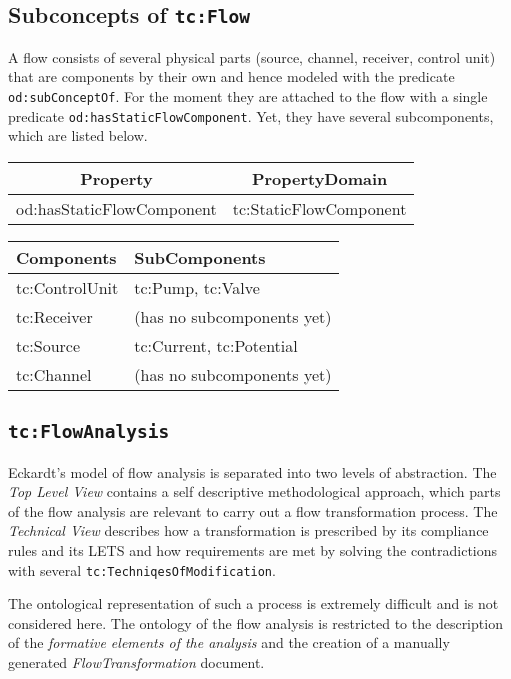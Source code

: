 \documentclass[a4paper,11pt]{article}
\begin{document}
\subsection{Subconcepts of \texttt{tc:Flow}}

A flow consists of several physical parts (source, channel, receiver, control
unit) that are components by their own and hence modeled with the predicate
\texttt{od:subConceptOf}. For the moment they are attached to the flow with a
single predicate \texttt{od:hasStaticFlowComponent}. Yet, they have several
subcomponents, which are listed below.

\begin{center}
\begin{tabular}{|c|c|}\hline
Property & PropertyDomain \\\hline
od:hasStaticFlowComponent & tc:StaticFlowComponent \\\hline 
\end{tabular}
\end{center}

\begin{center}
\begin{tabular}{|l|p{10cm}|}\hline
Components & SubComponents \\\hline
tc:ControlUnit & tc:Pump, tc:Valve \\
tc:Receiver & (has no subcomponents yet) \\
tc:Source & tc:Current, tc:Potential \\
tc:Channel & (has no subcomponents yet)\\\hline 
\end{tabular}
\end{center}

\subsection{\texttt{tc:FlowAnalysis}}
Eckardt's model of flow analysis is separated into two levels of abstraction.
The \emph{Top Level View} contains a self descriptive methodological approach,
which parts of the flow analysis are relevant to carry out a flow
transformation process. The \emph{Technical View} describes how a
transformation is prescribed by its compliance rules and its LETS and how
requirements are met by solving the contradictions with several
\texttt{tc:TechniqesOfModification}.

The ontological representation of such a process is extremely difficult and is
not considered here. The ontology of the flow analysis is restricted to the
description of the \emph{formative elements of the analysis} and the creation
of a manually generated \emph{FlowTransformation} document.
\end{document}
